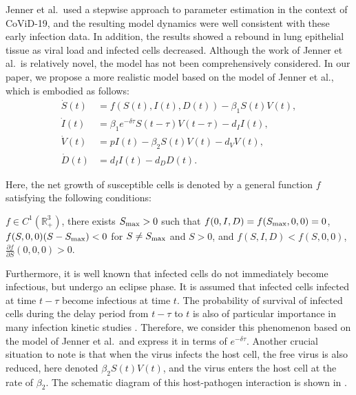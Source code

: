 \documentclass{CMHPhD-SIVD}
\begin{document}
Jenner et al.\ used a stepwise approach to parameter estimation in the context of CoViD-19, and the resulting model dynamics were well consistent with these early infection data. In addition, the results showed a rebound in lung epithelial tissue as viral load and infected cells decreased. Although the work of Jenner et al.\ is relatively novel, the model has not been comprehensively considered. In our paper, we propose a more realistic model based on the model of Jenner et al., which is embodied as follows:
\begin{subequations}\label{SIVD}
   \begin{align}
		 \dot{S}(t) &= f(S(t), I(t), D(t))-\beta_1 S(t)V(t),
		 \label{SIVD-S}\\[3pt]
		 \dot{I}(t) &= \beta_1 e^{-\delta \tau}S(t-\tau)V(t-\tau)-d_I I(t),
		 \label{SIVD-I}\\[3pt]
				 \dot{V}(t) &= pI(t)-\beta_2 S(t)V(t)-d_V V(t),
		 \label{SIVD-V}\\[3pt]
		 \dot{D}(t) &= d_I I(t)-d_D D(t).
		 \label{SIVD-D}
   \end{align}
\end{subequations}

Here, the net growth of susceptible cells is denoted by a general function $f$ satisfying the following conditions:

  $f\in C^1(\mathbb{R}_+^3)$,
	there exists $S_{\text{max}}>0$ such that $f(0,I,D)=f(S_{\text{max}},0,0)=0$,
	$f(S,0,0)(S-S_{\text{max}})<0$ for $S\neq S_{\text{max}}$ and $S>0$, and
	$f(S,I,D) < f(S,0,0)$, $\frac{\partial f}{\partial S}(0,0,0)>0$.

Furthermore, it is well known that infected cells do not immediately become infectious, but undergo an eclipse phase. It is assumed that infected cells infected at time $t-\tau$ become infectious at time $t$. The probability of survival of infected cells during the delay period from $t-\tau$ to $t$ is also of particular importance in many infection kinetic studies \cite{xu2011global,song2010properties,bera2015delay,sazonov2020viral}. Therefore, we consider this phenomenon based on the model of Jenner et al.\ and express it in terms of $e^{-\delta \tau}$. Another crucial situation to note is that when the virus infects the host cell, the free virus is also reduced, here denoted $\beta_2 S(t)V(t)$, and the virus enters the host cell at the rate of $\beta_2$. The schematic diagram of this host-pathogen interaction is shown in .
\end{document}
